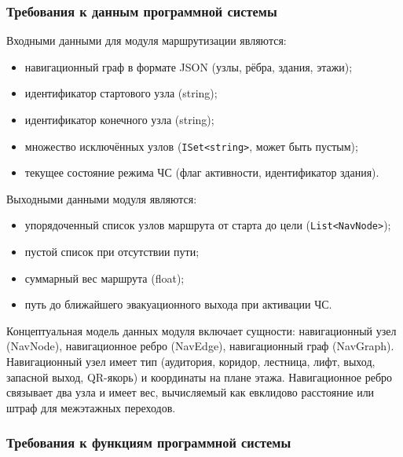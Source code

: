 \subsubsection{Требования к данным программной системы}

Входными данными для модуля маршрутизации являются:
\begin{itemize}
\item навигационный граф в формате JSON (узлы, рёбра, здания, этажи);
\item идентификатор стартового узла (string);
\item идентификатор конечного узла (string);
\item множество исключённых узлов (\texttt{ISet<string>}, может быть пустым);
\item текущее состояние режима ЧС (флаг активности, идентификатор здания).
\end{itemize}

Выходными данными модуля являются:
\begin{itemize}
\item упорядоченный список узлов маршрута от старта до цели (\texttt{List<NavNode>});
\item пустой список при отсутствии пути;
\item суммарный вес маршрута (float);
\item путь до ближайшего эвакуационного выхода при активации ЧС.
\end{itemize}

Концептуальная модель данных модуля включает сущности: навигационный узел (NavNode), навигационное ребро (NavEdge), навигационный граф (NavGraph). Навигационный узел имеет тип (аудитория, коридор, лестница, лифт, выход, запасной выход, QR-якорь) и координаты на плане этажа. Навигационное ребро связывает два узла и имеет вес, вычисляемый как евклидово расстояние или штраф для межэтажных переходов.

\subsubsection{Требования к функциям программной системы}

